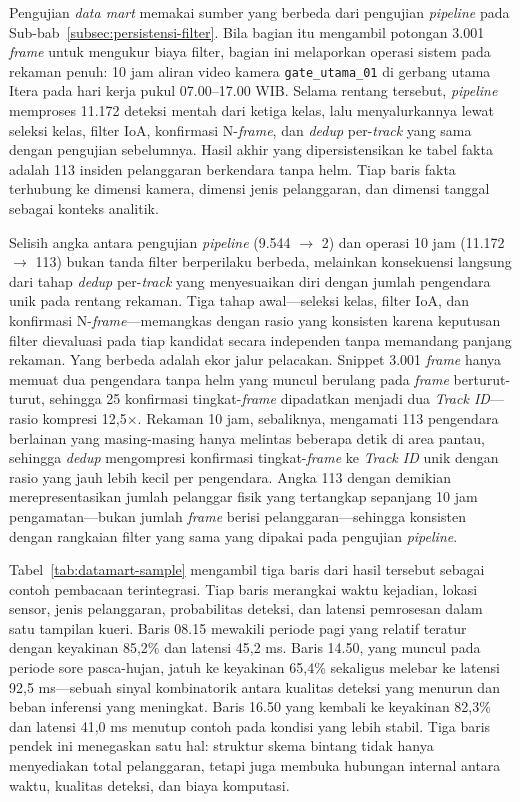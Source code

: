 Pengujian \textit{data mart} memakai sumber yang berbeda dari pengujian \textit{pipeline} pada Sub-bab~\ref{subsec:persistensi-filter}. Bila bagian itu mengambil potongan 3.001 \textit{frame} untuk mengukur biaya filter, bagian ini melaporkan operasi sistem pada rekaman penuh: 10 jam aliran video kamera \texttt{gate\_utama\_01} di gerbang utama Itera pada hari kerja pukul 07.00--17.00 WIB. Selama rentang tersebut, \textit{pipeline} memproses 11.172 deteksi mentah dari ketiga kelas, lalu menyalurkannya lewat seleksi kelas, filter IoA, konfirmasi N-\textit{frame}, dan \textit{dedup} per-\textit{track} yang sama dengan pengujian sebelumnya. Hasil akhir yang dipersistensikan ke tabel fakta adalah 113 insiden pelanggaran berkendara tanpa helm. Tiap baris fakta terhubung ke dimensi kamera, dimensi jenis pelanggaran, dan dimensi tanggal sebagai konteks analitik.

Selisih angka antara pengujian \textit{pipeline} (9.544 $\to$ 2) dan operasi 10 jam (11.172 $\to$ 113) bukan tanda filter berperilaku berbeda, melainkan konsekuensi langsung dari tahap \textit{dedup} per-\textit{track} yang menyesuaikan diri dengan jumlah pengendara unik pada rentang rekaman. Tiga tahap awal---seleksi kelas, filter IoA, dan konfirmasi N-\textit{frame}---memangkas dengan rasio yang konsisten karena keputusan filter dievaluasi pada tiap kandidat secara independen tanpa memandang panjang rekaman. Yang berbeda adalah ekor jalur pelacakan. Snippet 3.001 \textit{frame} hanya memuat dua pengendara tanpa helm yang muncul berulang pada \textit{frame} berturut-turut, sehingga 25 konfirmasi tingkat-\textit{frame} dipadatkan menjadi dua \textit{Track ID}---rasio kompresi 12,5$\times$. Rekaman 10 jam, sebaliknya, mengamati 113 pengendara berlainan yang masing-masing hanya melintas beberapa detik di area pantau, sehingga \textit{dedup} mengompresi konfirmasi tingkat-\textit{frame} ke \textit{Track ID} unik dengan rasio yang jauh lebih kecil per pengendara. Angka 113 dengan demikian merepresentasikan jumlah pelanggar fisik yang tertangkap sepanjang 10 jam pengamatan---bukan jumlah \textit{frame} berisi pelanggaran---sehingga konsisten dengan rangkaian filter yang sama yang dipakai pada pengujian \textit{pipeline}.

Tabel~\ref{tab:datamart-sample} mengambil tiga baris dari hasil tersebut sebagai contoh pembacaan terintegrasi. Tiap baris merangkai waktu kejadian, lokasi sensor, jenis pelanggaran, probabilitas deteksi, dan latensi pemrosesan dalam satu tampilan kueri. Baris 08.15 mewakili periode pagi yang relatif teratur dengan keyakinan 85,2\% dan latensi 45,2 ms. Baris 14.50, yang muncul pada periode sore pasca-hujan, jatuh ke keyakinan 65,4\% sekaligus melebar ke latensi 92,5 ms---sebuah sinyal kombinatorik antara kualitas deteksi yang menurun dan beban inferensi yang meningkat. Baris 16.50 yang kembali ke keyakinan 82,3\% dan latensi 41,0 ms menutup contoh pada kondisi yang lebih stabil. Tiga baris pendek ini menegaskan satu hal: struktur skema bintang tidak hanya menyediakan total pelanggaran, tetapi juga membuka hubungan internal antara waktu, kualitas deteksi, dan biaya komputasi.

